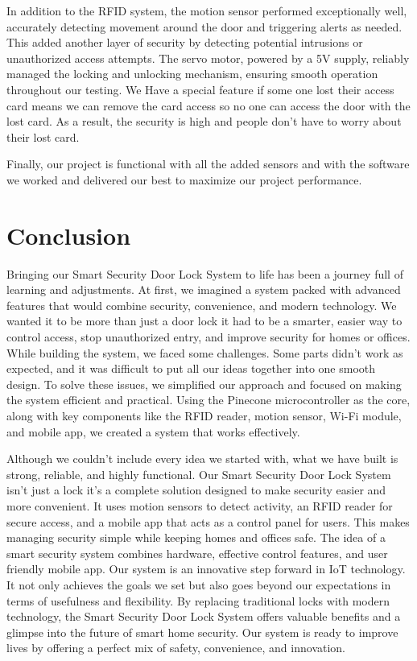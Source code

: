 \documentclass[USenglish,oneside,twocolumn]{article}
\begin{document}
In addition to the RFID system, the motion sensor performed exceptionally well, accurately detecting movement around the door and triggering alerts as needed. This added another layer of security by detecting potential intrusions or unauthorized access attempts. The servo motor, powered by a 5V supply, reliably managed the locking and unlocking mechanism, ensuring smooth operation throughout our testing. We Have a special feature if some one lost their access card means we can remove the card access so no one can access the door with the lost card. As a result, the security is high and people don't have to worry about their lost card. 

Finally, our project is functional with all the added sensors and with the software we worked and delivered our best to maximize our project performance.
	
	\section{Conclusion}
\label{sec:Conclusion}

Bringing our Smart Security Door Lock System to life has been a journey full of learning and adjustments. At first, we imagined a system packed with advanced features that would combine security, convenience, and modern technology. We wanted it to be more than just a door lock  it had to be a smarter, easier way to control access, stop unauthorized entry, and improve security for homes or offices. While building the system, we faced some challenges. Some parts didn’t work as expected, and it was difficult to put all our ideas together into one smooth design. To solve these issues, we simplified our approach and focused on making the system efficient and practical. Using the Pinecone microcontroller as the core, along with key components like the RFID reader, motion sensor, Wi-Fi module, and mobile app, we created a system that works effectively.

Although we couldn’t include every idea we started with, what we have built is strong, reliable, and highly functional. Our Smart Security Door Lock System isn’t just a lock it’s a complete solution designed to make security easier and more convenient. It uses motion sensors to detect activity, an RFID reader for secure access, and a mobile app that acts as a control panel for users. This makes managing security simple while keeping homes and offices safe. The idea of a smart security system combines  hardware, effective control features, and user friendly mobile app. Our system is an innovative step forward in IoT technology. It not only achieves the goals we set but also goes beyond our expectations in terms of usefulness and flexibility. By replacing traditional locks with modern technology, the Smart Security Door Lock System offers valuable benefits and a glimpse into the future of smart home security. Our system is ready to improve lives by offering a perfect mix of safety, convenience, and innovation. 


	\printbibliography[title={References}]
\end{document}
